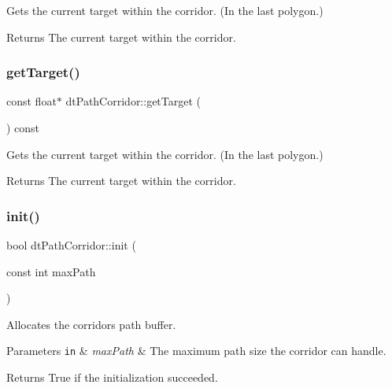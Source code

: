 Gets the current target within the corridor. (In the last polygon.) \begin{DoxyReturn}{Returns}
The current target within the corridor. 
\end{DoxyReturn}
\mbox{\label{classdtPathCorridor_aa1ea66fedbbab0cabfb279287aee392b}} 
\subsubsection{\texorpdfstring{get\+Target()}{getTarget()}\hspace{0.1cm}{\footnotesize\ttfamily [2/2]}}
{\footnotesize\ttfamily const float$\ast$ dt\+Path\+Corridor\+::get\+Target (\begin{DoxyParamCaption}{ }\end{DoxyParamCaption}) const\hspace{0.3cm}{\ttfamily [inline]}}

Gets the current target within the corridor. (In the last polygon.) \begin{DoxyReturn}{Returns}
The current target within the corridor. 
\end{DoxyReturn}
\mbox{\label{classdtPathCorridor_a85b4c98157b68a57b9c3302f45d0ed7f}} 
\subsubsection{\texorpdfstring{init()}{init()}\hspace{0.1cm}{\footnotesize\ttfamily [1/2]}}
{\footnotesize\ttfamily bool dt\+Path\+Corridor\+::init (\begin{DoxyParamCaption}\item[{const int}]{max\+Path }\end{DoxyParamCaption})}

Allocates the corridor\textquotesingle{}s path buffer. 
\begin{DoxyParams}[1]{Parameters}
\mbox{\tt in}  & {\em max\+Path} & The maximum path size the corridor can handle. \\
\hline
\end{DoxyParams}
\begin{DoxyReturn}{Returns}
True if the initialization succeeded. 
\end{DoxyReturn}
\mbox{\label{classdtPathCorridor_a85b4c98157b68a57b9c3302f45d0ed7f}} 
